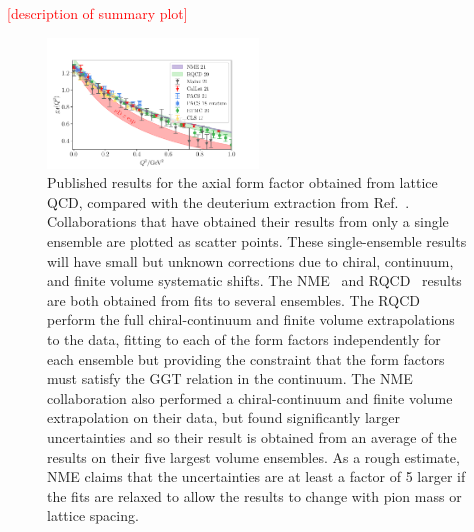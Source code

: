 \textcolor{red}{[description of summary plot]}

\begin{figure}[hbt!]
\centering
\includegraphics[width=0.5\textwidth]{plots/gaq2-overlay-standalone.pdf}
\vspace{10pt}
\caption{
Published results for the axial form factor obtained from lattice QCD,
 compared with the deuterium extraction from Ref.~\cite{Meyer:2016oeg}.
Collaborations that have obtained their results from only a single ensemble
 are plotted as scatter points.
These single-ensemble results will have small but unknown corrections due to chiral, continuum,
 and finite volume systematic shifts.
The NME~\cite{Park:2021ypf} and RQCD~\cite{RQCD:2019jai}
 results are both obtained from fits to several ensembles.
The RQCD perform the full chiral-continuum and finite volume extrapolations to the data,
 fitting to each of the form factors independently for each ensemble but providing
 the constraint that the form factors must satisfy the GGT relation in the continuum.
The NME collaboration also performed a chiral-continuum and finite volume extrapolation
 on their data, but found significantly larger uncertainties and so their result
 is obtained from an average of the results on their five largest volume ensembles.
As a rough estimate, NME claims that the uncertainties are at least a factor of 5 larger
 if the fits are relaxed to allow the results to change with pion mass or lattice spacing.
 }
\label{fig:gaq2_overlay}
\end{figure}

